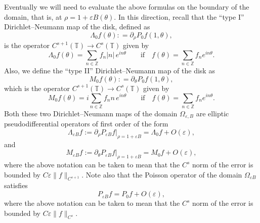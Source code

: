 \documentclass[12pt,reqno]{amsart}
\numberwithin{equation}{section}
\theoremstyle{definition}
\theoremstyle{remark}
\newtheorem{remark}[theorem]{Remark}
\begin{document}
Eventually we will need to evaluate the above formulas on the boundary of the domain, that is, at $\rho = 1+\varepsilon B(\theta)$.
In this direction, recall that the   ``type I'' Dirichlet--Neumann map of the disk, defined as
$$\Lambda_0 f(\theta) : = \partial_\rho  P_0 f(1,\theta) ,$$
is the operator $C^{s+1}(\mathbb{T}) \to C^s(\mathbb{T})$ given by
\[
\Lambda_0 f(\theta)= \sum_{n\in\mathbb{Z}} f_n |n|\, e^{in\theta}
\qquad\text{if}\quad f(\theta) = \sum_{n\in\mathbb{Z}} f_n e^{in\theta} .
\]
Also, we  define  the ``type II'' Dirichlet--Neumann map of the disk  as
\[
M_0 f(\theta) : = \partial_\theta  P_0 f(1,\theta) ,
\]
which is the operator $C^{s+1}(\mathbb{T}) \to C^s(\mathbb{T})$ given by
\[
M_0 f(\theta)= i\sum_{n\in\mathbb{Z}} f_n n\, e^{in\theta}
\qquad\text{if}\quad f(\theta) = \sum_{n\in\mathbb{Z}} f_n e^{in\theta} .
\] 
Both these two Dirichlet--Neumann maps of the domain $\varOmega_{\varepsilon, B}$ are elliptic pseudodifferential operators of first order of the form
\begin{equation*}%
\Lambda_{\varepsilon B} f := \partial_\rho P_{\varepsilon B} f \big|_{\rho=1+\varepsilon B}
= \Lambda_0 f + O(\varepsilon) ,
\end{equation*}
and
\begin{equation*}%
M_{\varepsilon B} f := \partial_\theta P_{\varepsilon B} f \big|_{\rho=1+\varepsilon B}
= M_0 f + O(\varepsilon) ,
\end{equation*}
where the above notation can be taken to mean that the $C^s$ norm of the error is bounded by $C\varepsilon\|f\|_{C^{s+1}}$. 
Note also that the Poisson operator of the domain $\varOmega_{\varepsilon B}$ satisfies
\begin{equation*}%
P_{\varepsilon B} f  =   P_{0} f  + O(\varepsilon) ,
\end{equation*}
where the above notation can be taken to mean that the $C^s$ norm of the error is bounded by $C\varepsilon\|f\|_{C^{s}}$.
\end{document}
